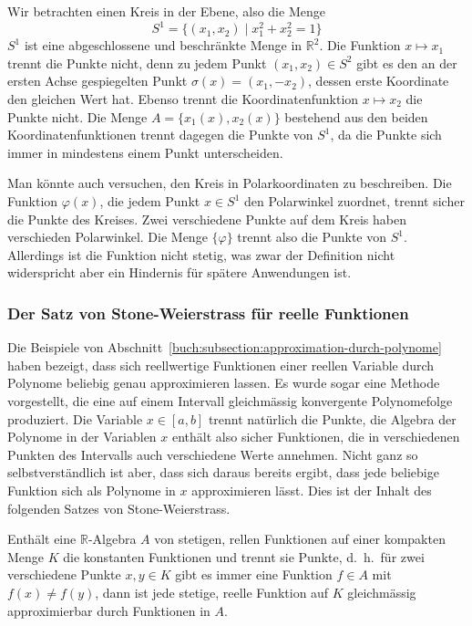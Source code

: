 \begin{beispiel}
Wir betrachten einen Kreis in der Ebene, also die Menge
\[
S^1
=
\{(x_1,x_2)\;|\; x_1^2 + x_2^2=1\}
\]
$S^1$ ist eine abgeschlossene und beschränkte Menge in $\mathbb{R}^2$.
Die Funktion $x\mapsto x_1$ trennt die Punkte nicht, denn zu jedem
Punkt $(x_1,x_2)\in S^2$ gibt es den an der ersten Achse
gespiegelten Punkt $\sigma(x)=(x_1,-x_2)$, dessen erste Koordinate
den gleichen Wert hat.
Ebenso trennt die Koordinatenfunktion $x\mapsto x_2$ die Punkte nicht.
Die Menge $A=\{ x_1(x), x_2(x)\}$ bestehend aus den beiden
Koordinatenfunktionen trennt dagegen die Punkte von $S^1$, da die Punkte
sich immer in mindestens einem Punkt unterscheiden.

Man könnte auch versuchen, den Kreis in Polarkoordinaten zu beschreiben.
Die Funktion $\varphi(x)$, die jedem Punkt $x\in S^1$ den Polarwinkel
zuordnet, trennt sicher die Punkte des Kreises.
Zwei verschiedene Punkte auf dem Kreis haben verschieden Polarwinkel.
Die Menge $\{\varphi\}$ trennt also die Punkte von $S^1$.
Allerdings ist die Funktion nicht stetig, was zwar der Definition
nicht widerspricht aber ein Hindernis für spätere Anwendungen ist.
\end{beispiel}


\subsubsection{Der Satz von Stone-Weierstrass für reelle Funktionen}
Die Beispiele von Abschnitt~\ref{buch:subsection:approximation-durch-polynome}
haben bezeigt, dass sich reellwertige Funktionen einer reellen
Variable durch Polynome beliebig genau approximieren lassen.
Es wurde sogar eine Methode vorgestellt, die eine auf einem Intervall
gleichmässig konvergente Polynomefolge produziert.
Die Variable $x\in[a,b]$ trennt natürlich die Punkte, die Algebra der
Polynome in der Variablen $x$ enthält also sicher Funktionen, die in
verschiedenen Punkten des Intervalls auch verschiedene Werte annehmen.
Nicht ganz so selbstverständlich ist aber, dass sich daraus bereits
ergibt, dass jede beliebige Funktion sich als Polynome in $x$
approximieren lässt.
Dies ist der Inhalt des folgenden Satzes von Stone-Weierstrass.

\begin{satz}
\label{buch:satz:stone-weierstrass}
Enthält eine $\mathbb{R}$-Algebra $A$ von stetigen, rellen Funktionen
auf einer kompakten Menge $K$ die konstanten Funktionen und trennt sie
Punkte, d.~h.~für zwei verschiedene Punkte $x,y\in K$ gibt es
immer eine Funktion $f\in A$ mit $f(x)\ne f(y)$, dann ist jede stetige,
reelle Funktion auf $K$ gleichmässig approximierbar durch Funktionen 
in $A$.
\end{satz}

